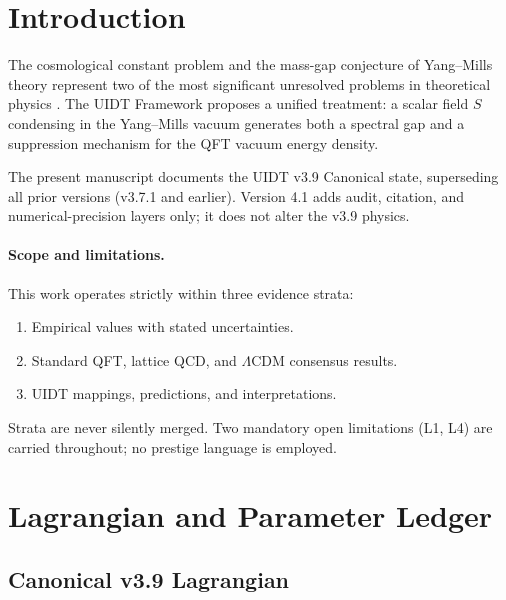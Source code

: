 \documentclass[12pt,a4paper]{article}
\newcommand{\UIDT}{\textsc{UIDT}}
\begin{document}
\tableofcontents
\newpage

\section{Introduction}
\label{sec:intro}

The cosmological constant problem and the mass-gap conjecture of Yang--Mills
theory represent two of the most significant unresolved problems in theoretical
physics \cite{Weinberg1989,Jaffe2006}.
The \UIDT{} Framework proposes a unified treatment: a scalar field $S$
condensing in the Yang--Mills vacuum generates both a spectral gap and a
suppression mechanism for the QFT vacuum energy density.

The present manuscript documents the \UIDT{} v3.9 Canonical state,
superseding all prior versions (v3.7.1 and earlier).
Version 4.1 adds audit, citation, and numerical-precision layers only;
it does not alter the v3.9 physics.

\paragraph{Scope and limitations.}
This work operates strictly within three evidence strata:
\begin{enumerate}
  \item[I.] Empirical values with stated uncertainties.
  \item[II.] Standard QFT, lattice QCD, and $\Lambda$CDM consensus results.
  \item[III.] \UIDT{} mappings, predictions, and interpretations.
\end{enumerate}
Strata are never silently merged.
Two mandatory open limitations (L1, L4) are carried throughout;
no prestige language is employed.

\section{Lagrangian and Parameter Ledger}
\label{sec:lagrangian}

\subsection{Canonical v3.9 Lagrangian}
\end{document}
